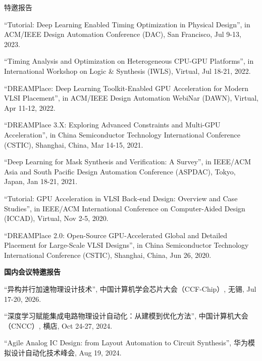 \begin{rSection}{特邀报告}
\begin{description}[font=\normalfont]
\item[{[7]}]{
``Tutorial: Deep Learning Enabled Timing Optimization in Physical Design'', in ACM/IEEE Design Automation Conference (DAC), San Francisco, Jul 9-13, 2023. 
}

\item[{[6]}]{
``Timing Analysis and Optimization on Heterogeneous CPU-GPU Platforms'', in International Workshop on Logic \& Synthesis (IWLS), Virtual, Jul 18-21, 2022. 
}

\item[{[5]}]{
``DREAMPlace: Deep Learning Toolkit-Enabled GPU Acceleration for Modern VLSI Placement'', in ACM/IEEE Design Automation WebiNar (DAWN), Virtual, Apr 11-12, 2022. 
}

\item[{[4]}]{
``DREAMPlace 3.X: Exploring Advanced Constraints and Multi-GPU Acceleration'', in China Semiconductor Technology International Conference (CSTIC), Shanghai, China, Mar 14-15, 2021. 
}

\item[{[3]}]{
``Deep Learning for Mask Synthesis and Verification: A Survey'', in IEEE/ACM Asia and South Pacific Design Automation Conference (ASPDAC), Tokyo, Japan, Jan 18-21, 2021.
}

\item[{[2]}]{
``Tutorial: GPU Acceleration in VLSI Back-end Design: Overview and Case Studies'', in IEEE/ACM International Conference on Computer-Aided Design (ICCAD), Virtual, Nov 2-5, 2020. 
}

\item[{[1]}]{
``DREAMPlace 2.0: Open-Source GPU-Accelerated Global and Detailed Placement for Large-Scale VLSI Designs'', in China Semiconductor Technology International Conference (CSTIC), Shanghai, China, Jun 26, 2020. 
}

\end{description}

\textbf{国内会议特邀报告}
        
\begin{description}[font=\normalfont]

\item[{[13]}]{
``异构并行加速物理设计技术'', 中国计算机学会芯片大会（CCF-Chip）, 无锡, Jul 17-20, 2026. 
}

\item[{[12]}]{
``深度学习赋能集成电路物理设计自动化：从建模到优化方法'', 中国计算机大会（CNCC）, 横店, Oct 24-27, 2024. 
}

\item[{[11]}]{
``Agile Analog IC Design: from Layout Automation to Circuit Synthesis'', 华为模拟设计自动化技术峰会, Aug 19, 2024. 
}


\end{description}
\end{rSection}
